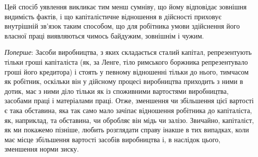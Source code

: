 Цей спосіб уявлення викликає тим менш сумніву, що йому
відповідає зовнішня видимість фактів, і що капіталістичне відношення
в дійсності приховує внутрішній зв’язок таким способом,
що для робітника умови здійснення його власної праці виявляються
чимось байдужим, зовнішнім і чужим.

\emph{Поперше}: Засоби виробництва, з яких складається сталий
капітал, репрезентують тільки гроші капіталіста (як, за Ленге,
тіло римського боржника репрезентувало гроші його кредитора)
і стоять у певному відношенні тільки до нього, тимчасом як
робітник, оскільки він у дійсному процесі виробництва приходить
з ними в дотик, має з ними діло тільки як із споживними вартостями
виробництва, засобами праці і матеріалами праці. Отже,
зменшення чи збільшення цієї вартості є така обставина, яка так
само мало зачіпає відношення робітника до капіталіста, як, наприклад,
та обставина, чи обробляє він мідь чи залізо. Звичайно, капіталіст,
як ми покажемо пізніше, любить розглядати справу інакше
в тих випадках, коли має місце збільшення вартості засобів
виробництва і, в наслідок цього, зменшення норми зиску.
